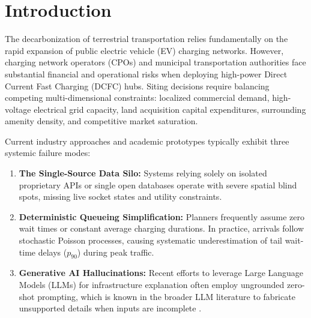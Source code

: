 \documentclass[preprint,12pt,authoryear]{elsarticle}
\begin{document}
\section{Introduction}
\label{sec:intro}
The decarbonization of terrestrial transportation relies fundamentally on the rapid expansion of public electric vehicle (EV) charging networks. However, charging network operators (CPOs) and municipal transportation authorities face substantial financial and operational risks when deploying high-power Direct Current Fast Charging (DCFC) hubs. Siting decisions require balancing competing multi-dimensional constraints: localized commercial demand, high-voltage electrical grid capacity, land acquisition capital expenditures, surrounding amenity density, and competitive market saturation.

Current industry approaches and academic prototypes typically exhibit three systemic failure modes:
\begin{enumerate}
    \item \textbf{The Single-Source Data Silo:} Systems relying solely on isolated proprietary APIs or single open databases operate with severe spatial blind spots, missing live socket states and utility constraints.
    \item \textbf{Deterministic Queueing Simplification:} Planners frequently assume zero wait times or constant average charging durations. In practice, arrivals follow stochastic Poisson processes, causing systematic underestimation of tail wait-time delays ($p_{90}$) during peak traffic.
    \item \textbf{Generative AI Hallucinations:} Recent efforts to leverage Large Language Models (LLMs) for infrastructure explanation often employ ungrounded zero-shot prompting, which is known in the broader LLM literature to fabricate unsupported details when inputs are incomplete \citep{lewis2020retrieval}.
\end{enumerate}
\end{document}
